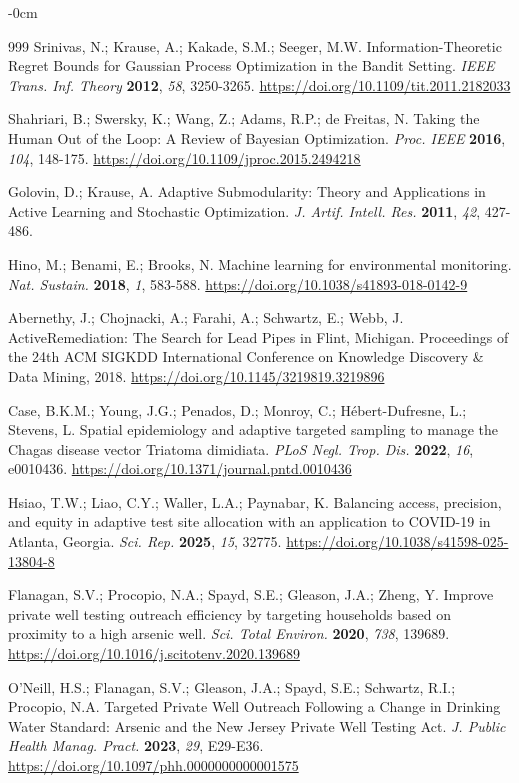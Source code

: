 \documentclass[sustainability,article,submit,pdftex,moreauthors]{Definitions/mdpi}
\begin{document}
\begin{adjustwidth}{-\extralength}{0cm}
\begin{thebibliography}{999}
Srinivas, N.; Krause, A.; Kakade, S.M.; Seeger, M.W. Information-Theoretic Regret Bounds for Gaussian Process Optimization in the Bandit Setting. \textit{IEEE Trans. Inf. Theory} \textbf{2012}, \textit{58}, 3250-3265. \url{https://doi.org/10.1109/tit.2011.2182033}

Shahriari, B.; Swersky, K.; Wang, Z.; Adams, R.P.; de Freitas, N. Taking the Human Out of the Loop: A Review of Bayesian Optimization. \textit{Proc. IEEE} \textbf{2016}, \textit{104}, 148-175. \url{https://doi.org/10.1109/jproc.2015.2494218}

Golovin, D.; Krause, A. Adaptive Submodularity: Theory and Applications in Active Learning and Stochastic Optimization. \textit{J. Artif. Intell. Res.} \textbf{2011}, \textit{42}, 427-486.

Hino, M.; Benami, E.; Brooks, N. Machine learning for environmental monitoring. \textit{Nat. Sustain.} \textbf{2018}, \textit{1}, 583-588. \url{https://doi.org/10.1038/s41893-018-0142-9}

Abernethy, J.; Chojnacki, A.; Farahi, A.; Schwartz, E.; Webb, J. ActiveRemediation: The Search for Lead Pipes in Flint, Michigan. Proceedings of the 24th ACM SIGKDD International Conference on Knowledge Discovery \& Data Mining, 2018. \url{https://doi.org/10.1145/3219819.3219896}

Case, B.K.M.; Young, J.G.; Penados, D.; Monroy, C.; H\'{e}bert-Dufresne, L.; Stevens, L. Spatial epidemiology and adaptive targeted sampling to manage the Chagas disease vector Triatoma dimidiata. \textit{PLoS Negl. Trop. Dis.} \textbf{2022}, \textit{16}, e0010436. \url{https://doi.org/10.1371/journal.pntd.0010436}

Hsiao, T.W.; Liao, C.Y.; Waller, L.A.; Paynabar, K. Balancing access, precision, and equity in adaptive test site allocation with an application to COVID-19 in Atlanta, Georgia. \textit{Sci. Rep.} \textbf{2025}, \textit{15}, 32775. \url{https://doi.org/10.1038/s41598-025-13804-8}

Flanagan, S.V.; Procopio, N.A.; Spayd, S.E.; Gleason, J.A.; Zheng, Y. Improve private well testing outreach efficiency by targeting households based on proximity to a high arsenic well. \textit{Sci. Total Environ.} \textbf{2020}, \textit{738}, 139689. \url{https://doi.org/10.1016/j.scitotenv.2020.139689}

O'Neill, H.S.; Flanagan, S.V.; Gleason, J.A.; Spayd, S.E.; Schwartz, R.I.; Procopio, N.A. Targeted Private Well Outreach Following a Change in Drinking Water Standard: Arsenic and the New Jersey Private Well Testing Act. \textit{J. Public Health Manag. Pract.} \textbf{2023}, \textit{29}, E29-E36. \url{https://doi.org/10.1097/phh.0000000000001575}


\end{thebibliography}
\end{adjustwidth}
\end{document}
